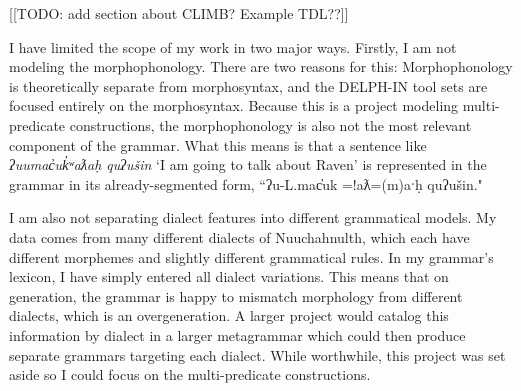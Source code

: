 [[TODO: add section about CLIMB? Example TDL??]]

I have limited the scope of my work in two major ways. Firstly, I am not modeling the morphophonology. There are two reasons for this: Morphophonology is theoretically separate from morphosyntax, and the DELPH-IN tool sets are focused entirely on the morphosyntax. Because this is a project modeling multi-predicate constructions, the morphophonology is also not the most relevant component of the grammar. What this means is that a sentence like \textit{ʔuumac̓uk̓ʷaƛaḥ quʔušin} `I am going to talk about Raven' is represented in the grammar in its already-segmented form, ``ʔu-L.mac̓uk =!aƛ=(m)aˑḥ quʔušin."

I am also not separating dialect features into different grammatical models. My data comes from many different dialects of Nuuchahnulth, which each have different morphemes and slightly different grammatical rules. In my grammar's lexicon, I have simply entered all dialect variations. This means that on generation, the grammar is happy to mismatch morphology from different dialects, which is an overgeneration. A larger project would catalog this information by dialect in a larger metagrammar which could then produce separate grammars targeting each dialect. While worthwhile, this project was set aside so I could focus on the multi-predicate constructions.


